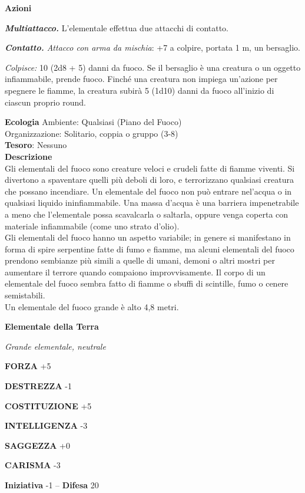\begin{multicols}{2}
\textbf{Azioni}

\textit{\textbf{Multiattacco.}} L'elementale effettua due attacchi di contatto.

\textit{\textbf{Contatto.} Attacco con arma da mischia}: +7 a colpire, portata 1 m, un bersaglio.

\textit{Colpisce:} 10 (2d8 + 5) danni da fuoco. Se il bersaglio è una creatura o un oggetto infiammabile, prende fuoco. Finché una creatura non impiega un'azione per spegnere le fiamme, la creatura subirà 5 (1d10) danni da fuoco all'inizio di ciascun proprio round.

\textbf{Ecologia}
Ambiente: Qualsiasi (Piano del Fuoco)\\
Organizzazione: Solitario, coppia o gruppo (3-8)\\
\textbf{Tesoro}: Nessuno\\
\textbf{Descrizione}\\
Gli elementali del fuoco sono creature veloci e crudeli fatte di fiamme viventi. Si divertono a spaventare quelli più deboli di loro, e terrorizzano qualsiasi creatura che possano incendiare. Un elementale del fuoco non può entrare nel'acqua o in qualsiasi liquido ininfiammabile. Una massa d'acqua è una barriera impenetrabile a meno che l'elementale possa scavalcarla o saltarla, oppure venga coperta con materiale infiammabile (come uno strato d'olio).\\
Gli elementali del fuoco hanno un aspetto variabile; in genere si manifestano in forma di spire serpentine fatte di fumo e fiamme, ma alcuni elementali del fuoco prendono sembianze più simili a quelle di umani, demoni o altri mostri per aumentare il terrore quando compaiono improvvisamente. Il corpo di un elementale del fuoco sembra fatto di fiamme o sbuffi di scintille, fumo o cenere semistabili.\\

Un elementale del fuoco grande è alto 4,8 metri.

\medskip{}\textbf{Elementale della Terra}

\textit{Grande elementale, neutrale}

\textbf{FORZA} +5

\textbf{DESTREZZA} -1

\textbf{COSTITUZIONE} +5

\textbf{INTELLIGENZA} -3

\textbf{SAGGEZZA} +0

\textbf{CARISMA} -3

\textbf{Iniziativa} -1 -- \textbf{Difesa} 20


\end{multicols}
